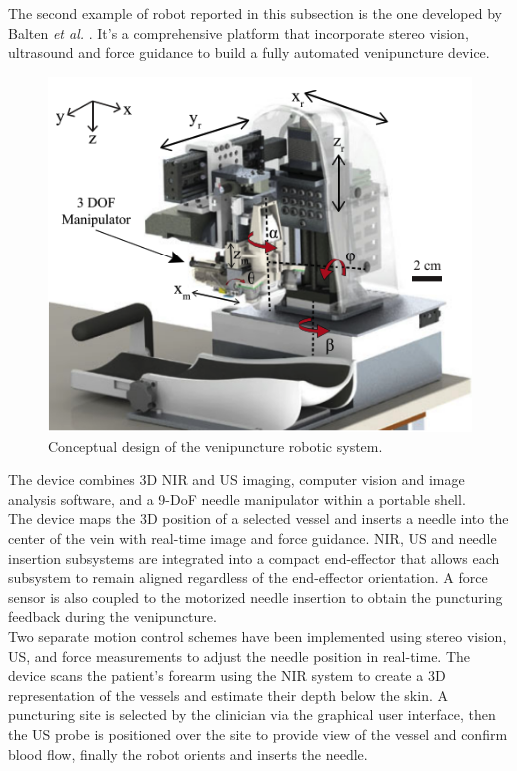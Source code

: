 The second example of robot reported in this subsection is the one developed by Balten \textit{et al.} \cite{Balter2017}.
It's a comprehensive platform that incorporate stereo vision, ultrasound and force guidance to build a fully automated venipuncture device.
\begin{figure}
	\includegraphics[width=\textwidth]{images/venipuncture_robot.png}
	\caption[The venipunture robot]{Conceptual design of the venipuncture robotic system. \cite{Balter2017}}
	\label{fig:venipuncture_robot}
\end{figure}
The device combines 3D NIR and US imaging, computer vision and image analysis software, and a 9-DoF needle manipulator within a portable shell.\\
The device maps the 3D position of a selected vessel and inserts a needle into the center of the vein with real-time image and force guidance.
NIR, US and needle insertion subsystems are integrated into a compact end-effector that allows each subsystem to remain aligned regardless of the end-effector orientation. A force sensor is also coupled to the motorized needle insertion to obtain the puncturing feedback during the venipuncture.\\
Two separate motion control schemes have been implemented using stereo vision, US, and force measurements to adjust the needle position in real-time.
The device scans the patient’s forearm using the NIR system to create a 3D representation of the vessels and estimate their depth below the skin. 
A puncturing site is selected by the clinician via the graphical user interface, then the US probe is positioned over the site to provide view of the vessel and confirm blood flow, finally the robot orients and inserts the needle.

